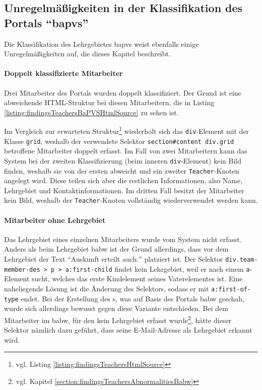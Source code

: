\subsection{Unregelmäßigkeiten in der Klassifikation des Portals "`\gls{bapvs}"'}
    Die Klassifikation des Lehrgebietes \gls{bapvs}
    weist ebenfalls einige Unregelmäßigkeiten auf,
    die dieses Kapitel beschreibt.

    \paragraph{Doppelt klassifizierte Mitarbeiter}
    Drei Mitarbeiter des Portals wurden doppelt klassifiziert.
    Der Grund ist eine abweichende HTML-Struktur bei diesen Mitarbeitern,
    die in Listing \ref{listing:findingsTeachersBaPVSHtmlSource} zu sehen ist.

    

    Im Vergleich zur erwarteten Struktur\footnote{vgl. Listing \ref{listing:findingsTeachersHtmlSource}} wiederholt sich
    das \texttt{div}-Element mit der Klasse \texttt{grid},
    weshalb der verwendete Selektor \texttt{section\#content div.grid}
    betroffene Mitarbeiter doppelt erfasst.
    Im Fall von zwei Mitarbeitern kann das System bei der zweiten Klassifizierung
    (beim inneren \texttt{div}-Element) kein Bild finden,
    weshalb sie von der ersten abweicht und ein zweiter \texttt{Teacher}-Knoten angelegt wird.
    Diese teilen sich aber die restlichen Informationen,
    also Name, Lehrgebiet und Kontaktinformationen.
    Im dritten Fall besitzt der Mitarbeiter kein Bild,
    weshalb der \texttt{Teacher}-Knoten vollständig wiederverwendet werden kann.

    \paragraph{Mitarbeiter ohne Lehrgebiet}
    Das Lehrgebiet eines einzelnen Mitarbeiters wurde vom System nicht erfasst.
    Anders als beim Lehrgebiet \gls{babw} ist der Grund allerdings,
    dass vor dem Lehrgebiet der Text "`Auskunft erteilt auch:"' platziert ist.
    Der Selektor \texttt{div.team-member-des > p > a:first-child} findet
    kein Lehrgebiet, weil er nach einem \texttt{a}-Element sucht,
    welches das erste Kindelement seines Vaterelementes ist.
    Eine naheliegende Lösung ist die Änderung des Selektors,
    sodass er mit \texttt{a:first-of-type} endet.
    Bei der Erstellung des {\classificationModel}s,
    was auf Basis des Portals \gls{babw} geschah,
    wurde sich allerdings bewusst gegen diese Variante entschieden.
    Bei dem Mitarbeiter im \gls{babw}, für den kein Lehrgebiet erfasst
    wurde\footnote{vgl. Kapitel \ref{section:findingsTeachersAbnormalitiesBabw}},
    hätte dieser Selektor nämlich dazu geführt,
    dass seine E-Mail-Adresse als Lehrgebiet erkannt wird.

